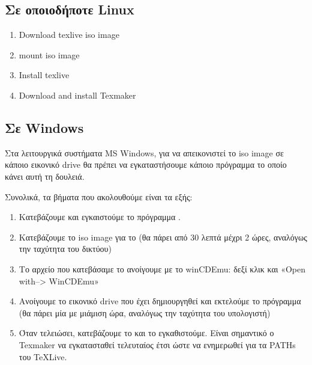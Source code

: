 \documentclass[letterpaper,10pt,greek]{sphinxhowto}
\begin{document}
\subsection{Σε οποιοδήποτε Linux}
\label{\detokenize{HowToInstallLaTeX:linux}}\begin{enumerate}
%
\item {} 
\sphinxAtStartPar
Download texlive iso image

\item {} 
\sphinxAtStartPar
mount iso image

\item {} 
\sphinxAtStartPar
Install texlive

\item {} 
\sphinxAtStartPar
Download and install Texmaker

\end{enumerate}


\subsection{Σε Windows}
\label{\detokenize{HowToInstallLaTeX:windows}}
\sphinxAtStartPar
Στα λειτουργικά συστήματα MS Windows, για να απεικονιστεί το iso image
σε κάποιο εικονικό drive θα πρέπει να εγκαταστήσουμε κάποιο πρόγραμμα
το οποίο κάνει αυτή τη δουλειά.

\sphinxAtStartPar
Συνολικά, τα βήματα που ακολουθούμε είναι τα εξής:
\begin{enumerate}
%
\item {} 
\sphinxAtStartPar
Κατεβάζουμε και εγκαιστούμε το πρόγραμμα .

\item {} 
\sphinxAtStartPar
Κατεβάζουμε το iso image για το  (θα πάρει από 30 λεπτά μέχρι 2 ώρες, αναλόγως την ταχύτητα του δικτύου)

\item {} 
\sphinxAtStartPar
Το αρχείο που κατεβάσαμε το ανοίγουμε με το winCDEmu: δεξί κλικ και «Open with–> WinCDEmu»

\item {} 
\sphinxAtStartPar
Ανοίγουμε το εικονικό drive που έχει δημιουργηθεί και εκτελούμε το πρόγραμμα  (θα πάρει μία με μιάμιση ώρα, αναλόγως την ταχύτητα του υπολογιστή)

\item {} 
\sphinxAtStartPar
Όταν τελειώσει, κατεβάζουμε το  και το εγκαθιστούμε. Είναι σημαντικό ο Texmaker να εγκατασταθεί τελευταίος έτσι ώστε να ενημερωθεί για τα PATHs του TeXLive.

\end{enumerate}
\end{document}

